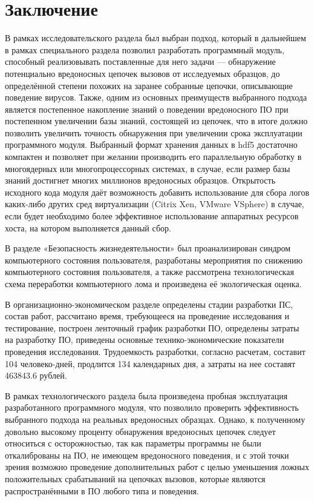 \section* {Заключение}
В рамках исследовательского раздела был выбран подход, который в дальнейшем в рамках специального раздела позволил разработать программный модуль, способный реализовывать поставленные для него задачи --- обнаружение потенциально вредоносных цепочек вызовов от исследуемых образцов, до определённой степени похожих на заранее собранные цепочки, описывающие поведение вирусов. Также, одним из основных преимуществ выбранного подхода является постепенное накопление знаний о поведении вредоносного ПО при постепенном увеличении базы знаний, состоящей из цепочек, что в итоге должно позволить увеличить точность обнаружения при увеличении срока эксплуатации программного модуля. Выбранный формат хранения данных в hdf5 достаточно компактен и позволяет при желании производить его параллельную обработку в многоядерных или многопроцессорных системах, в случае, если размер базы знаний достигнет многих миллионов вредоносных образцов. Открытость исходного кода модуля даёт возможность добавить использование для сбора логов каких-либо других сред виртуализации (Citrix Xen, VMware VSphere) в случае, если будет необходимо более эффективное использование аппаратных ресурсов хоста, на котором выполняется данный сбор.

В разделе «Безопасность жизнедеятельности» был проанализирован синдром компьютерного состояния пользователя, разработаны мероприятия по снижению компьютерного состояния пользователя, а также рассмотрена технологическая схема переработки компьютерного лома и произведена её экологическая оценка.

В организационно-экономическом разделе определены стадии разработки ПС, состав работ, рассчитано время, требующееся на проведение исследования и тестирование, построен ленточный график разработки ПО, определены затраты на разработку ПО, приведены основные технико-экономические показатели проведения исследования. 
Трудоемкость разработки, согласно расчетам, составит 104 человеко-дней, продлится 134 календарных дня, а затраты на нее составят 463843.6 рублей.

В рамках технологического раздела была произведена пробная эксплуатация разработанного программного модуля, что позволило проверить эффективность выбранного подхода на реальных вредоносных образцах. Однако, к полученному довольно высокому проценту обнаружения вредоносных цепочек следует относиться с осторожностью, так как параметры программы не были откалиброваны на ПО, не имеющем вредоносного поведения, и с этой точки зрения возможно проведение дополнительных работ с целью уменьшения ложных положительных срабатываний на цепочках вызовов, которые являются распространёнными в ПО любого типа и поведения.

